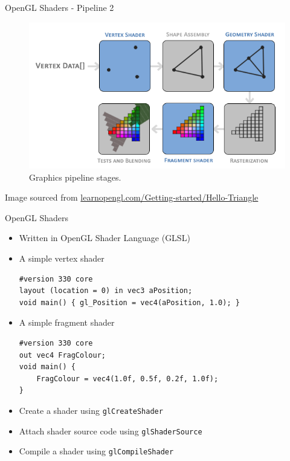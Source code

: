 \documentclass{beamer}
\begin{document}
\begin{frame}{OpenGL Shaders - Pipeline 2}
    \begin{figure}
        \includegraphics{images/pipeline.png}
        \caption{Graphics pipeline stages.}
    \end{figure}
    \vfill{}
    Image sourced from \url{learnopengl.com/Getting-started/Hello-Triangle}
\end{frame}

\begin{frame}[fragile]{OpenGL Shaders}
    \begin{itemize}
        \item Written in OpenGL Shader Language (GLSL)
        \item A simple vertex shader
              \begin{verbatim}
#version 330 core
layout (location = 0) in vec3 aPosition;
void main() { gl_Position = vec4(aPosition, 1.0); }
\end{verbatim}
        \item A simple fragment shader
              \begin{verbatim}
#version 330 core
out vec4 FragColour;
void main() {
    FragColour = vec4(1.0f, 0.5f, 0.2f, 1.0f);
}
\end{verbatim}
        \item Create a shader using {\color{blue}\verb"glCreateShader"}
        \item Attach shader source code using {\color{blue}\verb"glShaderSource"}
        \item Compile a shader using {\color{blue}\verb"glCompileShader"}
    \end{itemize}
\end{frame}
\end{document}
